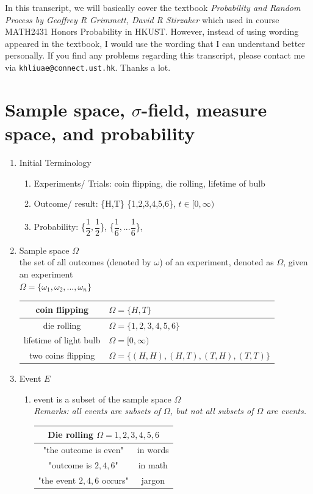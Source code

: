 \documentclass[11pt]{article}
\begin{document}
In this transcript, we will basically cover the textbook \textit{Probability and Random Process by Geoffrey R Grimmett, David R Stirzaker} which used in course MATH2431 Honors Probability in HKUST. However, instead of using wording appeared in the textbook, I would use the wording that I can understand better personally. If you find any problems regarding this transcript, please contact me via \texttt{khliuae@connect.ust.hk}. Thanks a lot.
\tableofcontents
\newpage

\section{Sample space, $\sigma$-field, measure space, and probability}
\begin{enumerate}
\item Initial Terminology
\begin{enumerate}
\item Experiments/ Trials: coin flipping, die rolling, lifetime of bulb
\item Outcome/ result: \{H,T\} \{1,2,3,4,5,6\}, $t\in [0, \infty)$
\item Probability: \{$\dfrac{1}{2} , \dfrac{1}{2}$\}, \{$\dfrac{1}{6},...\dfrac{1}{6}$\},
\end{enumerate}

\item Sample space $\Omega$\\
the set of all outcomes (denoted by $\omega$) of an experiment, denoted as $\Omega$, given an experiment\\
$\Omega = \{ \omega _1, \omega _2, ..., \omega _n \}$\\
\begin{tabular}{|c|l|}
\hline
coin flipping& $\Omega = \{H, T\}$\\
\hline
die rolling& $\Omega = \{1, 2, 3, 4, 5, 6\}$\\
\hline
lifetime of light bulb& $\Omega = [0, \infty)$\\
\hline
two coins flipping& $\Omega = \{(H, H), (H, T), (T, H), (T, T)\}$\\
\hline
\end{tabular}

\item Event $E$
\begin{enumerate}
\item event is a subset of the sample space $\Omega$\\
\textit{Remarks: all events are subsets of $\Omega$, but not all subsets of $\Omega$ are events.}\\
\begin{tabular}{|c|c|}
\hline
\multicolumn{2}{|c|}{Die rolling $\Omega = {1,2,3,4,5,6}$}\\
\hline
"the outcome is even"& in words\\
\hline
"outcome is ${2,4,6}$"& in math\\
\hline
"the event ${2,4,6}$ occurs"& jargon\\
\hline
\end{tabular}


\end{enumerate}
\end{enumerate}
\end{document}
